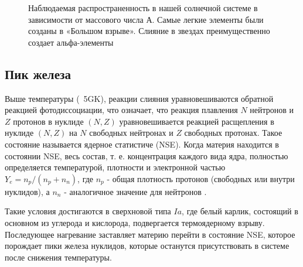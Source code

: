 \documentclass[%
master,    %
natbib,      %
subf,        %
href,        %
colorlinks,  %
]{disser}
\begin{document}
\begin{figure}[h]
	\caption{Наблюдаемая распространенность в нашей солнечной системе в зависимости от массового числа А. Самые легкие элементы были созданы в «Большом взрыве». Слияние в звездах преимущественно создает альфа-элементы \cite{abundancies}}
	\label{ris:abundancies}
\end{figure}

\subsection{Пик железа}

Выше температуры (~5GK), реакции слияния уравновешиваются обратной реакцией фотодиссоциации, что означает, что реакция плавления $N$ нейтронов и $Z$ протонов в нуклиде $(N, Z)$ уравновешивается реакцией расщепления в нуклиде $(N, Z)$ на $N$ свободных нейтронах и $Z$ свободных протонах. Такое состояние называется ядерное статистиче (NSE). Когда материя находится в состоянии NSE, весь состав, т. е. концентрация каждого вида ядра, полностью определяется температурой, плотности и электронной частью $Y_e = n_p/(n_p + n_n)$, где $n_p$ - общая плотность протонов (свободных или внутри нуклидов), а $n_n$ - аналогичное значение для нейтронов \cite{nse}.

Такие условия достигаются в сверхновой типа $Ia$, где белый карлик, состоящий в основном из углерода и кислорода, подвергается термоядерному взрыву. Последующее нагревание заставляет материю перейти в состояние NSE, которое порождает пики железа нуклидов, которые останутся присутствовать в системе после снижения температуры.
\end{document}
